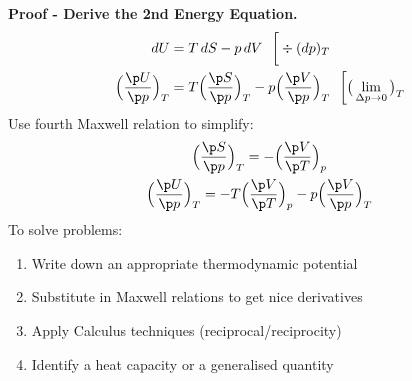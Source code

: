 \documentclass[a4paper, 11pt, normalem]{report}
\begin{document}
\textbf{Proof - Derive the 2nd Energy Equation.}
\begin{align*}
    dU &= T\,dS - p\,dV ~~\bigg[\div (dp)_T \\
    \Big(\frac{\p U}{\p p}\Big)_T &= T\Big(\frac{\p S}{\p p}\Big)_T - p\Big(\frac{\p V}{\p p}\Big)_T ~~\bigg[\big(\lim_{\Delta p \to 0}\big)_T
\end{align*}
Use fourth Maxwell relation to simplify:
\begin{gather*}
    \Big(\frac{\p S}{\p p} \Big)_T = -\Big(\frac{\p V}{\p T}\Big)_p \\
    \Big(\frac{\p U}{\p p}\Big)_T = -T\Big(\frac{\p V}{\p T}\Big)_p - p\Big(\frac{\p V}{\p p}\Big)_T
\end{gather*}
To solve problems:
\begin{enumerate}
    \item Write down an appropriate thermodynamic potential
    \item Substitute in Maxwell relations to get nice derivatives
    \item Apply Calculus techniques (reciprocal/reciprocity)
    \item Identify a heat capacity or a generalised quantity
\end{enumerate}
\end{document}
